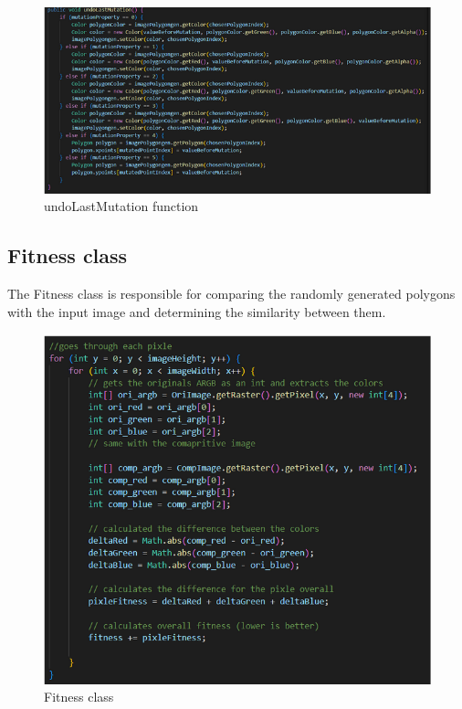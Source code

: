 \\

\\

\begin{figure}
\centering
\includegraphics[width=4.5in]{images/undomu.png}
\caption{undoLastMutation function}
\end{figure}
\newpage


\subsection{Fitness class}
\label{Fitness class}

The Fitness class is responsible for comparing the randomly generated polygons with the input image and determining the similarity between them. 
\begin{figure}
\centering
\includegraphics[width=4.5in]{images/fitness.png}

\caption{Fitness class }
\end{figure}

